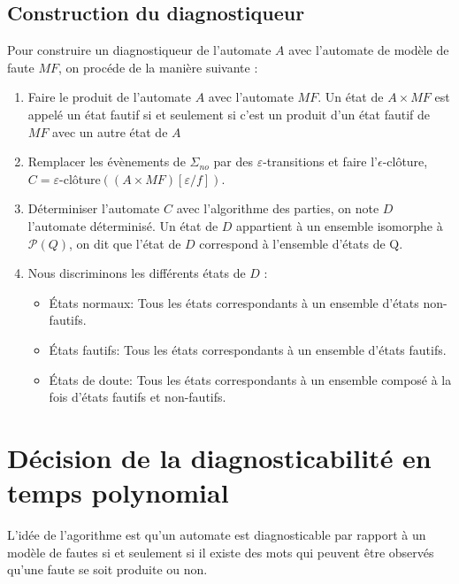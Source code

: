 \documentclass[10pt,a4paper]{article}
\begin{document}
    
    \subsection{Construction du diagnostiqueur}
    Pour construire un diagnostiqueur de l'automate $A$ avec l'automate de mod\`ele de faute $MF$, on proc\'ede de la mani\`ere suivante :
    
    \begin{enumerate}
            \item Faire le produit de l'automate $A$ avec l'automate $MF$. Un \'etat de $A\times MF$ est appel\'e un \'etat fautif si et seulement si c'est un produit d'un \'etat fautif de $MF$ avec un autre \'etat de $A$
            \item Remplacer les \'ev\`enements de $\Sigma_{no}$ par des $\varepsilon$-transitions et faire l'$\epsilon$-cl\^oture, $C = \varepsilon$-clôture$((A\times MF)[\varepsilon/f])$.
          \item D\'eterminiser l'automate $C$ avec l'algorithme des parties, on note $D$ l'automate d\'eterminis\'e. Un état de $D$ appartient à un ensemble isomorphe à $\mathcal{P}(Q)$, on dit que l'état de $D$ correspond à l'ensemble d'états de Q.
            \item Nous discriminons les diff\'erents \'etats de $D$ :
                    \begin{itemize}
                            \item  \'Etats normaux: Tous les \'etats correspondants à un ensemble d'\'etats non-fautifs.
                           \item \'Etats fautifs:  Tous les \'etats correspondants à un ensemble d'\'etats fautifs.
                            \item \'Etats de doute: Tous les \'etats correspondants à un ensemble composé à la fois d'\'etats fautifs et non-fautifs.
                    \end{itemize}  
                 
    \end{enumerate} 
     

\section{D\'ecision de la diagnosticabilit\'e en temps polynomial}

L'id\'ee de l'agorithme est qu'un automate est diagnosticable par rapport \`a un mod\`ele de fautes si et seulement si il existe des mots qui peuvent être observés qu'une faute se soit produite ou non.
\end{document}
